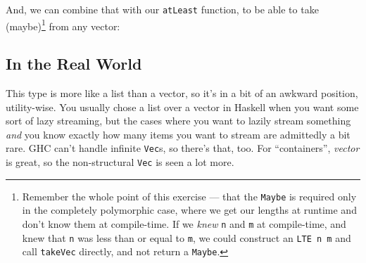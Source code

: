 \documentclass[]{article}
\newenvironment{Shaded}{}{}
\newcommand{\CommentTok}[1]{\textcolor[rgb]{0.38,0.63,0.69}{\textit{#1}}}
\newcommand{\DataTypeTok}[1]{\textcolor[rgb]{0.56,0.13,0.00}{#1}}
\newcommand{\FunctionTok}[1]{\textcolor[rgb]{0.02,0.16,0.49}{#1}}
\newcommand{\NormalTok}[1]{#1}
\newcommand{\OperatorTok}[1]{\textcolor[rgb]{0.40,0.40,0.40}{#1}}
\newcommand{\OtherTok}[1]{\textcolor[rgb]{0.00,0.44,0.13}{#1}}
\begin{document}
And, we can combine that with our \texttt{atLeast} function, to be able to take
(maybe)\footnote{Remember the whole point of this exercise --- that the
  \texttt{Maybe} is required only in the completely polymorphic case, where we
  get our lengths at runtime and don't know them at compile-time. If we
  \emph{knew} \texttt{n} and \texttt{m} at compile-time, and knew that
  \texttt{n} was less than or equal to \texttt{m}, we could construct an
  \texttt{LTE\ n\ m} and call \texttt{takeVec} directly, and not return a
  \texttt{Maybe}.} from any vector:

\begin{Shaded}
\end{Shaded}

\subsection{In the Real World}\label{in-the-real-world}

This type is more like a list than a vector, so it's in a bit of an awkward
position, utility-wise. You usually chose a list over a vector in Haskell when
you want some sort of lazy streaming, but the cases where you want to lazily
stream something \emph{and} you know exactly how many items you want to stream
are admittedly a bit rare. GHC can't handle infinite \texttt{Vec}s, so there's
that, too. For ``containers'', \emph{vector} is great, so the non-structural
\texttt{Vec} is seen a lot more.
\end{document}
